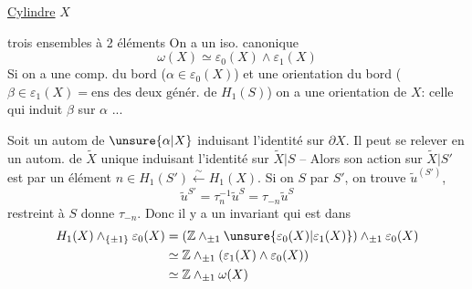 \uline{Cylindre}\quad{} $X$

trois ensembles à 2 éléments
On a un iso. canonique
\[
\omega(X)\simeq\varepsilon_0(X)\wedge\varepsilon_1(X)
\]
Si on a une comp.  du bord ($\alpha\in\varepsilon_0(X)$) et une orientation du bord ($\beta\in\varepsilon_1(X)=\text{ens des deux génér. de }H_1(S)$) on a une orientation de $X$: celle qui induit $\beta$ sur $\alpha$ ...

Soit un autom  de $\unsure{\alpha|X}$ induisant l'identité sur $\partial X$. Il peut se relever en un autom. de $\widetilde X$ unique  induisant l'identité sur $\widetilde X|S$ -- Alors son action sur $\widetilde X|S'$ est   par un élément  $n\in H_1(S')\xleftarrow{\sim}H_1(X)$. Si on   $S$ par $S'$, on trouve $\widetilde u^{(S')}$, 
\[
\widetilde u^{S'}=\tau_n^{-1}\widetilde u^S=\tau_{-n}\widetilde u^S
\]
  restreint à $S$ donne $\tau_{-n}$. Donc il y a un invariant qui est dans
\[
\begin{aligned}
H_1(X)\wedge_{\{\pm1\}}\varepsilon_0(X)
&=(\mathbb Z\wedge_{\pm1}\unsure{\varepsilon_0(X)|\varepsilon_1(X)})\wedge_{\pm1}\varepsilon_0(X)\\
&\simeq\mathbb Z\wedge_{\pm1}(\varepsilon_1(X)\wedge\varepsilon_0(X))\\
&\simeq\mathbb Z\wedge_{\pm1}\omega(X)
\end{aligned}
\]
